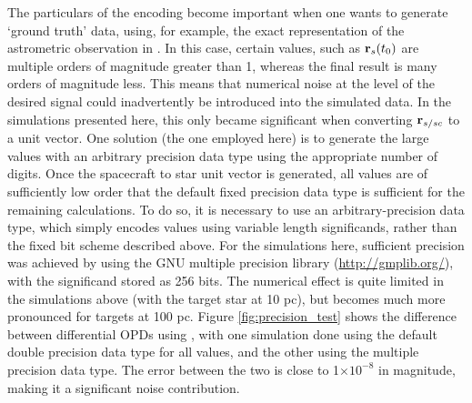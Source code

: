 The particulars of the encoding become important when one wants to generate `ground truth' data, using, for example, the exact representation of the astrometric observation in .  In this case, certain values, such as $\mathbf{r}_s(t_0)$ are multiple orders of magnitude greater than 1, whereas the final result is many orders of magnitude less.  This means that numerical noise at the level of the desired signal could inadvertently be introduced into the simulated data.  In the simulations presented here, this only became significant when converting $\mathbf{r}_{s/sc}$ to a unit vector. One solution (the one employed here) is to generate the large values with an arbitrary precision data type using the appropriate number of digits.  Once the spacecraft to star unit vector is generated, all values are of sufficiently low order that the default fixed precision data type is sufficient for the remaining calculations.  To do so, it is necessary to use an arbitrary-precision data type, which simply encodes values using variable length significands, rather than the fixed bit scheme described above.  For the simulations here, sufficient precision was achieved by using the GNU multiple precision library (\url{http://gmplib.org/}), with the significand stored as 256 bits.  The numerical effect is quite limited in the simulations above (with the target star at 10 pc), but becomes much more pronounced for targets at 100 pc.  Figure \ref{fig:precision_test} shows the difference between differential OPDs using , with one simulation done using the default double precision data type for all values, and the other using the multiple precision data type.  The error between the two is close to 1$\times10^{-8}$ in magnitude, making it a significant noise contribution.
